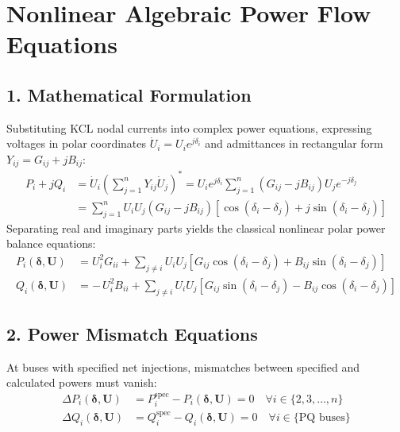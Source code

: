 \documentclass[12pt,a4paper,oneside]{report}
\begin{document}
\section{Nonlinear Algebraic Power Flow Equations}

\subsection{1. Mathematical Formulation}
Substituting KCL nodal currents into complex power equations, expressing voltages in polar coordinates $\dot{U}_i = U_i e^{j\delta_i}$ and admittances in rectangular form $Y_{ij} = G_{ij} + jB_{ij}$:
\begin{align}
P_i + jQ_i &= \dot{U}_i \left( \sum_{j=1}^n Y_{ij} \dot{U}_j \right)^* = U_i e^{j\delta_i} \sum_{j=1}^n (G_{ij} - jB_{ij}) U_j e^{-j\delta_j} \nonumber \\
&= \sum_{j=1}^n U_i U_j (G_{ij} - jB_{ij}) \left[ \cos(\delta_i - \delta_j) + j \sin(\delta_i - \delta_j) \right]
\end{align}
Separating real and imaginary parts yields the classical nonlinear polar power balance equations:
\begin{align}
P_i(\boldsymbol{\delta}, \mathbf{U}) &= U_i^2 G_{ii} + \sum_{j \ne i} U_i U_j \left[ G_{ij} \cos(\delta_i - \delta_j) + B_{ij} \sin(\delta_i - \delta_j) \right] \label{eq:p_polar} \\
Q_i(\boldsymbol{\delta}, \mathbf{U}) &= -\, U_i^2 B_{ii} + \sum_{j \ne i} U_i U_j \left[ G_{ij} \sin(\delta_i - \delta_j) - B_{ij} \cos(\delta_i - \delta_j) \right] \label{eq:q_polar}
\end{align}

\subsection{2. Power Mismatch Equations}
At buses with specified net injections, mismatches between specified and calculated powers must vanish:
\begin{align}
\Delta P_i(\boldsymbol{\delta}, \mathbf{U}) &= P_i^{\text{spec}} - P_i(\boldsymbol{\delta}, \mathbf{U}) = 0 \quad \forall i \in \{2, 3, \dots, n\} \\
\Delta Q_i(\boldsymbol{\delta}, \mathbf{U}) &= Q_i^{\text{spec}} - Q_i(\boldsymbol{\delta}, \mathbf{U}) = 0 \quad \forall i \in \{\text{PQ buses}\}
\end{align}
\end{document}
